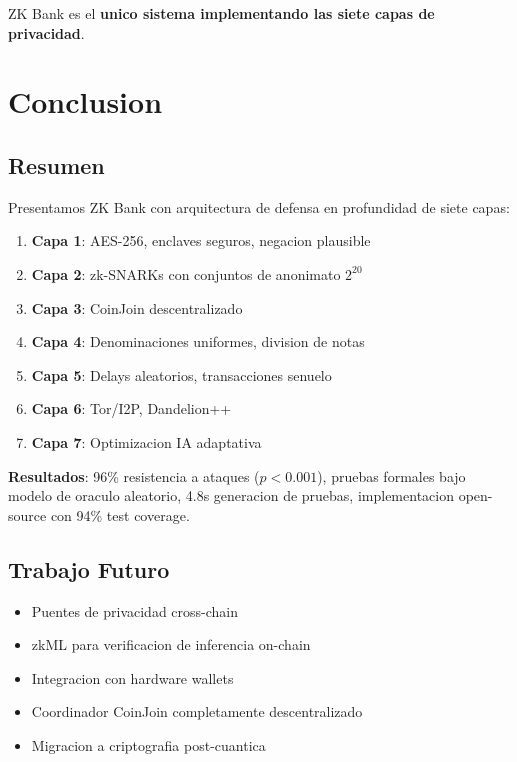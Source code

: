 \documentclass[11pt]{article}
\theoremstyle{definition}
\theoremstyle{plain}
\theoremstyle{remark}
\begin{document}
ZK Bank es el \textbf{unico sistema implementando las siete capas de privacidad}.

\section{Conclusion}
\label{sec:conclusion}

\subsection{Resumen}

Presentamos ZK Bank con arquitectura de defensa en profundidad de siete capas:

\begin{enumerate}
    \item \textbf{Capa 1}: AES-256, enclaves seguros, negacion plausible
    \item \textbf{Capa 2}: zk-SNARKs con conjuntos de anonimato $2^{20}$
    \item \textbf{Capa 3}: CoinJoin descentralizado
    \item \textbf{Capa 4}: Denominaciones uniformes, division de notas
    \item \textbf{Capa 5}: Delays aleatorios, transacciones senuelo
    \item \textbf{Capa 6}: Tor/I2P, Dandelion++
    \item \textbf{Capa 7}: Optimizacion IA adaptativa
\end{enumerate}

\textbf{Resultados}: 96\% resistencia a ataques ($p<0.001$), pruebas formales bajo modelo de oraculo aleatorio, 4.8s generacion de pruebas, implementacion open-source con 94\% test coverage.

\subsection{Trabajo Futuro}

\begin{itemize}
    \item Puentes de privacidad cross-chain
    \item zkML para verificacion de inferencia on-chain
    \item Integracion con hardware wallets
    \item Coordinador CoinJoin completamente descentralizado
    \item Migracion a criptografia post-cuantica
\end{itemize}
\end{document}
